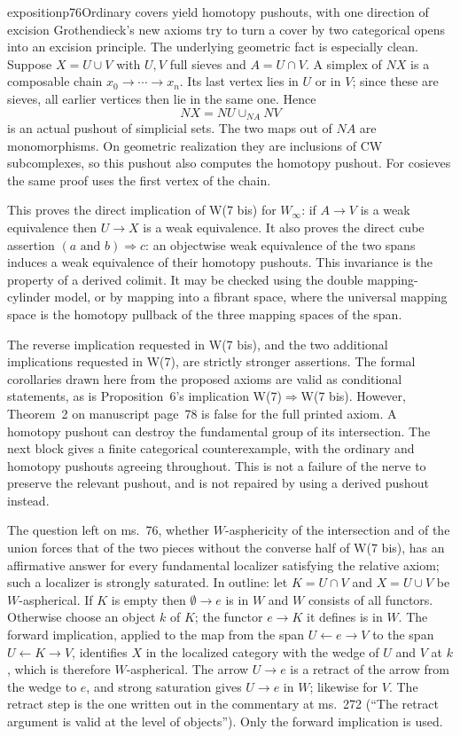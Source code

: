 \begin{dcomment}{exposition}{p76}{Ordinary covers yield homotopy pushouts, with one direction of excision}
Grothendieck's new axioms try to turn a cover by two categorical opens into an excision principle. The underlying geometric fact is especially clean. Suppose $X=U\cup V$ with $U,V$ full sieves and $A=U\cap V$. A simplex of $NX$ is a composable chain $x_0\to\cdots\to x_n$. Its last vertex lies in $U$ or in $V$; since these are sieves, all earlier vertices then lie in the same one. Hence
\[
 NX=NU\cup_{NA}NV
\]
is an actual pushout of simplicial sets. The two maps out of $NA$ are monomorphisms. On geometric realization they are inclusions of CW subcomplexes, so this pushout also computes the homotopy pushout. For cosieves the same proof uses the first vertex of the chain.

This proves the direct implication of W(7 bis) for $W_\infty$: if $A\to V$ is a weak equivalence then $U\to X$ is a weak equivalence. It also proves the direct cube assertion $(a\text{ and }b)\Rightarrow c$: an objectwise weak equivalence of the two spans induces a weak equivalence of their homotopy pushouts. This invariance is the property of a derived colimit. It may be checked using the double mapping-cylinder model, or by mapping into a fibrant space, where the universal mapping space is the homotopy pullback of the three mapping spaces of the span.

The reverse implication requested in W(7 bis), and the two additional implications requested in W(7), are strictly stronger assertions. The formal corollaries drawn here from the proposed axioms are valid as conditional statements, as is Proposition~6's implication W(7)$\Rightarrow$W(7 bis). However, Theorem~2 on manuscript page~78 is false for the full printed axiom. A homotopy pushout can destroy the fundamental group of its intersection. The next block gives a finite categorical counterexample, with the ordinary and homotopy pushouts agreeing throughout. This is not a failure of the nerve to preserve the relevant pushout, and is not repaired by using a derived pushout instead.

The question left on ms.~76, whether $W$-asphericity of the intersection and of the union forces that of the two pieces without the converse half of W(7 bis), has an affirmative answer for every fundamental localizer satisfying the relative axiom; such a localizer is strongly saturated. In outline: let $K=U\cap V$ and $X=U\cup V$ be $W$-aspherical. If $K$ is empty then $\emptyset\to e$ is in $W$ and $W$ consists of all functors. Otherwise choose an object $k$ of $K$; the functor $e\to K$ it defines is in $W$. The forward implication, applied to the map from the span $U\leftarrow e\to V$ to the span $U\leftarrow K\to V$, identifies $X$ in the localized category with the wedge of $U$ and $V$ at $k$, which is therefore $W$-aspherical. The arrow $U\to e$ is a retract of the arrow from the wedge to $e$, and strong saturation gives $U\to e$ in $W$; likewise for $V$. The retract step is the one written out in the commentary at ms.~272 (``The retract argument is valid at the level of objects''). Only the forward implication is used.
\end{dcomment}

